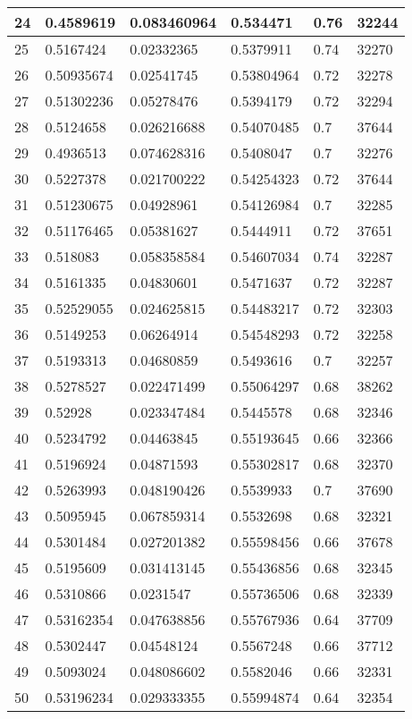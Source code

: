\begin{longtable}{|l|l|l|l|l|l|}
24 & 0.4589619 & 0.083460964 & 0.534471 & 0.76 & 32244 \\ \hline 
25 & 0.5167424 & 0.02332365 & 0.5379911 & 0.74 & 32270 \\ \hline 
26 & 0.50935674 & 0.02541745 & 0.53804964 & 0.72 & 32278 \\ \hline 
27 & 0.51302236 & 0.05278476 & 0.5394179 & 0.72 & 32294 \\ \hline 
28 & 0.5124658 & 0.026216688 & 0.54070485 & 0.7 & 37644 \\ \hline 
29 & 0.4936513 & 0.074628316 & 0.5408047 & 0.7 & 32276 \\ \hline 
30 & 0.5227378 & 0.021700222 & 0.54254323 & 0.72 & 37644 \\ \hline 
31 & 0.51230675 & 0.04928961 & 0.54126984 & 0.7 & 32285 \\ \hline 
32 & 0.51176465 & 0.05381627 & 0.5444911 & 0.72 & 37651 \\ \hline 
33 & 0.518083 & 0.058358584 & 0.54607034 & 0.74 & 32287 \\ \hline 
34 & 0.5161335 & 0.04830601 & 0.5471637 & 0.72 & 32287 \\ \hline 
35 & 0.52529055 & 0.024625815 & 0.54483217 & 0.72 & 32303 \\ \hline 
36 & 0.5149253 & 0.06264914 & 0.54548293 & 0.72 & 32258 \\ \hline 
37 & 0.5193313 & 0.04680859 & 0.5493616 & 0.7 & 32257 \\ \hline 
38 & 0.5278527 & 0.022471499 & 0.55064297 & 0.68 & 38262 \\ \hline 
39 & 0.52928 & 0.023347484 & 0.5445578 & 0.68 & 32346 \\ \hline 
40 & 0.5234792 & 0.04463845 & 0.55193645 & 0.66 & 32366 \\ \hline 
41 & 0.5196924 & 0.04871593 & 0.55302817 & 0.68 & 32370 \\ \hline 
42 & 0.5263993 & 0.048190426 & 0.5539933 & 0.7 & 37690 \\ \hline 
43 & 0.5095945 & 0.067859314 & 0.5532698 & 0.68 & 32321 \\ \hline 
44 & 0.5301484 & 0.027201382 & 0.55598456 & 0.66 & 37678 \\ \hline 
45 & 0.5195609 & 0.031413145 & 0.55436856 & 0.68 & 32345 \\ \hline 
46 & 0.5310866 & 0.0231547 & 0.55736506 & 0.68 & 32339 \\ \hline 
47 & 0.53162354 & 0.047638856 & 0.55767936 & 0.64 & 37709 \\ \hline 
48 & 0.5302447 & 0.04548124 & 0.5567248 & 0.66 & 37712 \\ \hline 
49 & 0.5093024 & 0.048086602 & 0.5582046 & 0.66 & 32331 \\ \hline 
50 & 0.53196234 & 0.029333355 & 0.55994874 & 0.64 & 32354 \\ \hline 
\end{longtable}